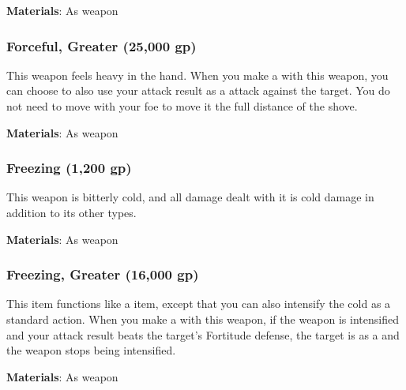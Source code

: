 \vspace{0.25em}
\textbf{Materials}: As weapon


\lowercase{\hypertarget{item:Forceful, Greater}{}}\label{item:Forceful, Greater}
\hypertarget{item:Forceful, Greater}{\subsubsection{Forceful, Greater\hfill{} (25,000 gp)}}

This weapon feels heavy in the hand.
When you make a  with this weapon, you can choose to also use your attack result as a  attack against the target.
You do not need to move with your foe to move it the full distance of the shove.



\vspace{0.25em}
\textbf{Materials}: As weapon


\lowercase{\hypertarget{item:Freezing}{}}\label{item:Freezing}
\hypertarget{item:Freezing}{\subsubsection{Freezing\hfill{} (1,200 gp)}}

This weapon is bitterly cold, and all damage dealt with it is cold damage in addition to its other types.



\vspace{0.25em}
\textbf{Materials}: As weapon


\lowercase{\hypertarget{item:Freezing, Greater}{}}\label{item:Freezing, Greater}
\hypertarget{item:Freezing, Greater}{\subsubsection{Freezing, Greater\hfill{} (16,000 gp)}}

This item functions like a  item, except that you can also intensify the cold as a standard action.
When you make a  with this weapon, if the weapon is intensified and your attack result beats the target's Fortitude defense,
the target is \chilled as a  and the weapon stops being intensified.



\vspace{0.25em}
\textbf{Materials}: As weapon


